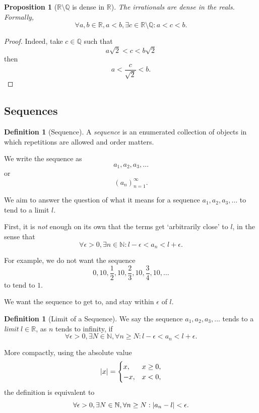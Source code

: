 \documentclass{article}
\newtheorem{proposition}[theorem]{Proposition}
\theoremstyle{definition}
\newtheorem{definition}[theorem]{Definition}
\theoremstyle{remark}
\DeclarePairedDelimiter{\abs}{\lvert}{\rvert}
\newcommand{\pqty}[1]{\left(#1\right)}
\newcommand{\NN}{\mathbb{N}}
\newcommand{\QQ}{\mathbb{Q}}
\newcommand{\RR}{\mathbb{R}}
\begin{document}
\begin{proposition}[\(\RR \setminus \QQ\) is dense in \(\RR\)]
    The irrationals are \emph{dense} in the reals. Formally,
    \[
        \forall a, b \in \RR, a < b, \exists c \in \RR \setminus \QQ: a < c < b.
    \]
\end{proposition}

\begin{proof}
    Indeed, take \(c \in \QQ\) such that
    \[
        a \sqrt{2} < c < b \sqrt{2}
    \]
    then
    \[
        a < \frac{c}{\sqrt{2}} < b.
    \]
\end{proof}

\subsection{Sequences}
\label{sec:sequences}

\begin{definition}[Sequence]
    A \emph{sequence} is an enumerated collection of objects in which repetitions are allowed and order matters.

    We write the sequence as
    \[
        a_1, a_2, a_3, \ldots
    \]
    or
    \[
        \pqty{a_n}_{n = 1}^{\infty}.
    \]
\end{definition}

We aim to answer the question of what it means for a sequence \(a_1, a_2, a_3, \ldots\) to tend to a limit \(l\).

First, it is \emph{not} enough on its own that the terms get `arbitrarily close' to \(l\), in the sense that
\[
    \forall \epsilon > 0, \exists n \in \NN: l - \epsilon < a_n < l + \epsilon.
\]

For example, we do not want the sequence
\[
    0, 10, \frac{1}{2}, 10, \frac{2}{3}, 10, \frac{3}{4}, 10, \ldots
\]
to tend to \(1\).

We want the sequence to get to, and stay within \(\epsilon\) of \(l\).

\begin{definition}[Limit of a Sequence]
    We say the sequence \(a_1, a_2, a_3, \ldots\) tends to a \emph{limit} \(l \in \RR\), as \(n\) tends to infinity, if
    \[
        \forall \epsilon > 0, \exists N \in \NN, \forall n \geq N: l - \epsilon < a_n < l + \epsilon.
    \]

    More compactly, using the absolute value
    \[
        \abs{x} = \begin{cases}
            x, & x \geq 0, \\
            -x, & x < 0,
        \end{cases}
    \]
    the definition is equivalent to
    \[
        \forall \epsilon > 0, \exists N \in \NN, \forall n \geq N: \abs{a_n - l} < \epsilon.
    \]
\end{definition}
\end{document}
